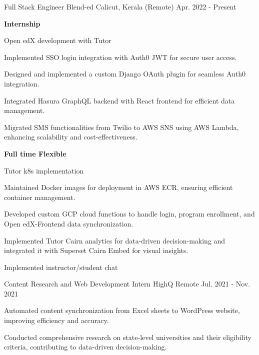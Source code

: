 
\begin{cventries}
  \cventry
    {Full Stack Engineer} %
    {Blend-ed} %
    {Calicut, Kerala (Remote)   } %
    {Apr. 2022 - Present} %
    {
      \begin{cvitems} %
        \item \textbf{Internship}
        \item Open edX development with Tutor
        \item Implemented SSO login integration with Auth0 JWT for secure user access.
        \item Designed and implemented a custom Django OAuth plugin for seamless Auth0 integration.
        \item Integrated Hasura GraphQL backend with React frontend for efficient data management.
        \item Migrated SMS functionalities from Twilio to AWS SNS using AWS Lambda, enhancing scalability and cost-effectiveness.
        \vspace{2mm}
        \item \textbf{Full time Flexible}
        \item Tutor k8s implementation
        \item Maintained Docker images for deployment in AWS ECR, ensuring efficient container management.
        \item Developed custom GCP cloud functions to handle login, program enrollment, and Open edX-Frontend data synchronization.
        \item Implemented Tutor Cairn analytics for data-driven decision-making and integrated it with Superset Cairn Embed for visual insights.
        \item Implemented instructor/student chat
      \end{cvitems}
    }

  \cventry
    {Content Research and Web Development Intern} %
    {HighQ} %
    {Remote} %
    {Jul. 2021 - Nov. 2021} %
    {
      \begin{cvitems} %
        \item Automated content synchronization from Excel sheets to WordPress website, improving efficiency and accuracy.
        \item Conducted comprehensive research on state-level universities and their eligibility criteria, contributing to data-driven decision-making.
      \end{cvitems}
    }
    
\end{cventries}
